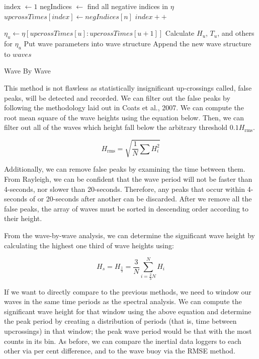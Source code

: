 \begin{algorithm}
    \begin{algorithmic}[1]
        \State index $\longleftarrow 1$
        \State negIndices $\longleftarrow$ find all negative indices in $\eta$ 
                \State $upcrossTimes[index] \longleftarrow negIndices[n]$
                \State $index++$
            \EndIf
        \EndFor

            \State $\eta_u \longleftarrow \eta[upcrossTimes[u]:upcrossTimes[u+1]]$
            \State Calculate $H_u$, $T_u$, and others for $\eta_u$
            \State Put wave parameters into wave structure
            \State Append the new wave structure to $waves$
        \EndFor
        \EndFunction
    \end{algorithmic}
    \caption{Wave By Wave}\label{alg:wave_by_wave}
\end{algorithm}

This method is not flawless as statistically insignificant up-crossings called, false peaks, will be detected and recorded. 
We can filter out the false peaks by following the methodology laid out in Coats et al., 2007. 
We can compute the root mean square of the wave heights using the equation below. 
Then, we can filter out all of the waves which height fall below the arbitrary threshold $0.1H_{\text{rms}}$.

\begin{equation}
    H_{\text{rms}} = \sqrt{\frac{1}{N} \sum{H_i^2}}
\end{equation}

Additionally, we can remove false peaks by examining the time between them. 
From Rayleigh, we can be confident that the wave period will not be faster than 4-seconds, nor slower than 20-seconds. 
Therefore, any peaks that occur within 4-seconds of or 20-seconds after another can be discarded. 
After we remove all the false peaks, the array of waves must be sorted in descending order according to their height.

From the wave-by-wave analysis, we can determine the significant wave height by calculating the highest one third of wave heights using:

\begin{equation}
    H_s = H_{\frac{1}{3}} = \frac{3}{N} \sum_{i=\frac{2}{3}N}^N H_i
\end{equation}

If we want to directly compare to the previous methods, we need to window our waves in the same time periods as the spectral analysis. 
We can compute the significant wave height for that window using the above equation and determine the peak period by creating a distribution of periods (that is, time between upcrossings) in that window; the peak wave period would be that with the most counts in its bin. 
As before, we can compare the inertial data loggers to each other via per cent difference, and to the wave buoy via the RMSE method.